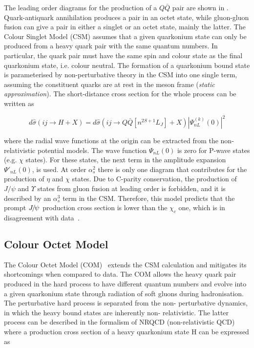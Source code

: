 The leading order diagrams for the production of a $Q\bar{Q}$ pair are shown in
. Quark-antiquark annihilation produces a pair in an octet
state, while gluon-gluon fusion can give a  pair in either a singlet or an
octet state, mainly the latter. The Colour Singlet Model (CSM)\cite{Humpert:171969}
assumes that a given quarkonium state can only be produced from a heavy quark
pair with the same quantum numbers. In particular, the quark pair must have
the same spin and colour state as the final quarkonium state, i.e. colour
neutral. The formation of a quarkonium bound state is parameterised by
non-perturbative theory in the CSM into one single term, assuming the constituent
quarks are at rest in the meson frame ({\it{static approximation}}). The 
short-distance cross section for the whole process can be written as

\begin{equation}
d{\hat{\sigma}}(ij\rightarrow H + X) = d{\hat{\sigma}}(ij\rightarrow Q{\bar{Q}}\left[n^{2S+1}L_J\right] + X) 
|\Psi^{(k)}_{nL}(0)|^2
\end{equation}

\noindent where the radial wave functions at the origin can be extracted from
the non-relativistic potential models. The wave function $\Psi_{nL}(0)$ is zero
for P-wave states (e.g. $\chi$ states). For these states, the next term in the
amplitude expansion $\Psi'_{nL}(0)$, is used. At order $\alpha_s^2$ there is
only one diagram that contributes for the production of $\eta$ and $\chi$
states. Due to C-parity conservation, the production of $J/\psi$ and $\Upsilon$
states from gluon fusion at leading order is forbidden, and it is described by
an $\alpha_s^3$ term in the CSM. Therefore, this model predicts that the
prompt ${{J\mskip -3mu/\mskip -2mu\psi\mskip 2mu}}$ production cross section is lower than the $\chi_c$ one, which is in
disagreement with data~\cite{Schuler:1994hy}.

\subsection{Colour Octet Model}

The Colour Octet Model (COM)~\cite{Braaten:1993rw,Bodwin:1994jh} extends the CSM calculation and
mitigates its shortcomings when compared to data. The COM allows the heavy
quark pair produced in the hard process to have different quantum numbers and
evolve into a given quarkonium state through radiation of soft gluons during
hadronisation. The perturbative hard process is separated from the non-
perturbative dynamics, in which the heavy bound states are inherently non-
relativistic. The latter process can be described in the formalism of NRQCD
(non-relativistic QCD) where a production cross section of a heavy quarkonium
state H can be expressed as

